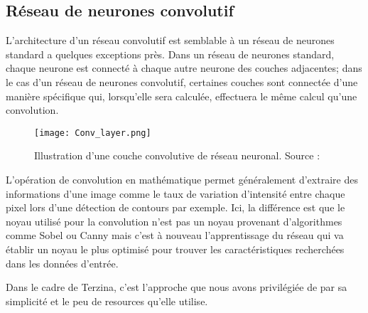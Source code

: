 \subsection{Réseau de neurones convolutif}
L'architecture d'un réseau convolutif est semblable à un réseau de neurones standard a quelques exceptions près.
Dans un réseau de neurones standard, chaque neurone est connecté à chaque autre neurone des couches adjacentes;
dans le cas d'un réseau de neurones convolutif, certaines couches sont connectée d'une manière spécifique qui,
lorsqu'elle sera calculée, effectuera le même calcul qu'une convolution.

\begin{figure}[tbph!]
	\centering
	\texttt{[image: Conv\_layer.png]}
	\caption[Illustration d'une couche convolutive de réseau neuronal]{Illustration d'une couche convolutive de réseau neuronal. Source : \cite{ConvImage}}
\end{figure}

L'opération de convolution en mathématique permet généralement d'extraire des informations d'une image comme le taux de 
variation d'intensité entre chaque pixel lors d'une détection de contours par exemple.
Ici, la différence est que le noyau utilisé pour la convolution n'est pas un noyau provenant d'algorithmes comme Sobel ou Canny mais c'est à nouveau
l'apprentissage du réseau qui va établir un noyau le plus optimisé pour trouver les caractéristiques recherchées dans les données d'entrée.

Dans le cadre de Terzina, c'est l'approche que nous avons privilégiée de par sa simplicité et le peu de resources qu'elle utilise.


